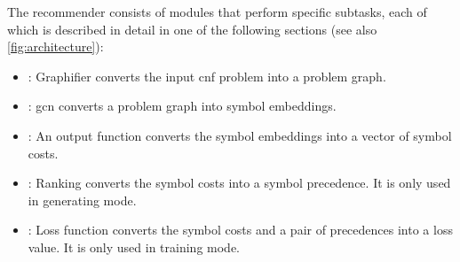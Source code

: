 The recommender consists of modules that perform specific subtasks,
each of which is described in detail in one of the following sections (see also \cref{fig:architecture}):
\begin{itemize}
\item {}: Graphifier converts the input \gls{cnf} problem into a problem graph.
\item {}: \Gls{gcn} converts a problem graph into symbol embeddings.
\item {}: An output function \cite{Zhou2018} converts the symbol embeddings into a vector of symbol costs.
\item {}: Ranking converts the symbol costs into a symbol precedence.
It is only used in generating mode.
\item {}: Loss function converts the symbol costs and a pair of precedences into a loss value.
It is only used in training mode.
\end{itemize}

